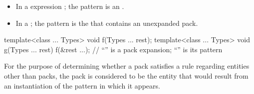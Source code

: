 \documentclass{wg21}
\begin{document}
\begin{itemize}
    \item In a  expression ; the pattern is an
    .


    \item In a  ;
    the pattern is the 
    that contains an unexpanded pack.
\end{itemize}

\begin{example} %
    \begin{codeblock}
        template<class ... Types> void f(Types ... rest);
        template<class ... Types> void g(Types ... rest) {
            f(&rest ...);     // ``'' is a pack expansion; ``'' is its pattern
        }
    \end{codeblock}
\end{example}

\pnum
For the purpose of determining whether a pack satisfies a rule
regarding entities other than packs, the pack is
considered to be the entity that would result from an instantiation of
the pattern in which it appears.
\end{document}
